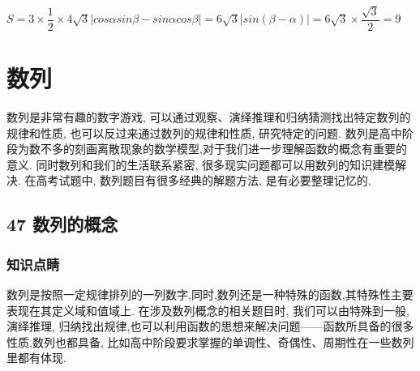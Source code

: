 \begin{enumerate}
\begin{jieda}
        $S = 3 \times \dfrac{1}{2} \times 4\sqrt{3}|cos\alpha sin\beta - sin\alpha cos\beta| = 6\sqrt{3}|sin(\beta-\alpha)| = 6\sqrt{3} \times \dfrac{\sqrt{3}}{2} = 9$

    \end{jieda}
\end{enumerate}
\section*{数列}

数列是非常有趣的数字游戏, 可以通过观察、演绎推理和归纳猜测找出特定数列的规律和性质, 也可以反过来通过数列的规律和性质, 研究特定的问题. 数列是高中阶段为数不多的刻画离散现象的数学模型,对于我们进一步理解函数的概念有重要的意义. 同时数列和我们的生活联系紧密, 很多现实问题都可以用数列的知识建模解决. 在高考试题中, 数列题目有很多经典的解题方法, 是有必要整理记忆的.

\subsection*{47 数列的概念}

\subsubsection*{知识点睛}

数列是按照一定规律排列的一列数字,同时,数列还是一种特殊的函数,其特殊性主要表现在其定义域和值域上. 在涉及数列概念的相关题目时, 我们可以由特殊到一般, 演绎推理, 归纳找出规律,也可以利用函数的思想来解决问题——函数所具备的很多性质,数列也都具备, 比如高中阶段要求掌握的单调性、奇偶性、周期性在一些数列里都有体现.


